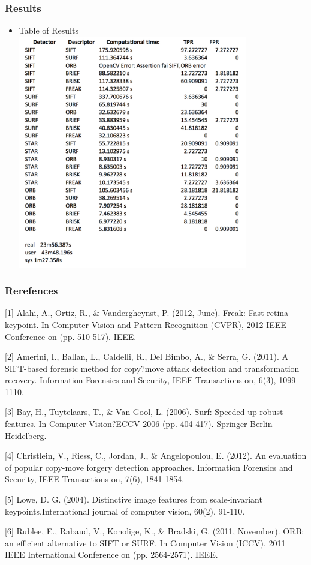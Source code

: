\documentclass{beamer}
\begin{document}
    \begin{frame}
        \frametitle{Results}
        \begin{itemize}[<+->]
            \item Table of Results
            \includegraphics[width=10cm]{results_table}
        \end{itemize}
    \end{frame}
    
     \begin{frame}
        \frametitle{Rerefences}
        [1] Alahi, A., Ortiz, R., \& Vandergheynst, P. (2012, June). Freak: Fast retina keypoint. In Computer Vision and Pattern Recognition (CVPR), 2012 IEEE Conference on (pp. 510-517). IEEE.

[2] Amerini, I., Ballan, L., Caldelli, R., Del Bimbo, A., \& Serra, G. (2011). A SIFT-based forensic method for copy?move attack detection and transformation recovery. Information Forensics and Security, IEEE
Transactions on, 6(3), 1099-1110.

[3] Bay, H., Tuytelaars, T., \& Van Gool, L. (2006). Surf: Speeded up robust features. In Computer Vision?ECCV 2006 (pp. 404-417). Springer Berlin Heidelberg.

[4] Christlein, V., Riess, C., Jordan, J., \& Angelopoulou, E. (2012). An evaluation of popular copy-move forgery detection approaches. Information Forensics and Security, IEEE Transactions on, 7(6),
1841-1854.

[5] Lowe, D. G. (2004). Distinctive image features from scale-invariant keypoints.International journal of computer vision, 60(2), 91-110.

[6] Rublee, E., Rabaud, V., Konolige, K., \& Bradski, G. (2011, November). ORB: an efficient alternative to SIFT or SURF. In Computer Vision (ICCV), 2011 IEEE International Conference on (pp. 2564-2571).
IEEE.

    \end{frame}
  
\end{document}
